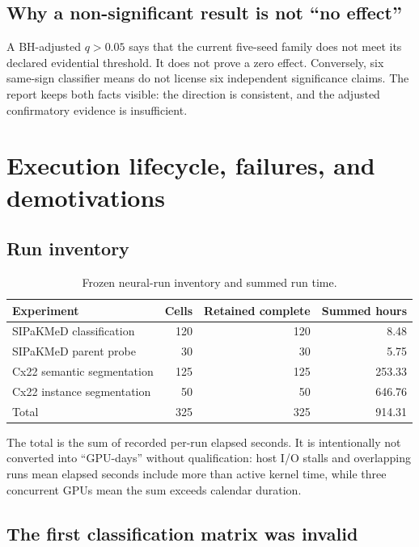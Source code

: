 \documentclass[11pt,oneside]{report}
\begin{document}
\section{Why a non-significant result is not ``no effect''}

A BH-adjusted $q>0.05$ says that the current five-seed family does not meet its declared evidential threshold. It does not prove a zero effect. Conversely, six same-sign classifier means do not license six independent significance claims. The report keeps both facts visible: the direction is consistent, and the adjusted confirmatory evidence is insufficient.

\chapter{Execution lifecycle, failures, and demotivations}

\section{Run inventory}

\begin{table}[H]
\centering
\caption{Frozen neural-run inventory and summed run time.}
\label{tab:inventory}
\begin{tabular}{lrrr}
\toprule
Experiment & Cells & Retained complete & Summed hours \\
\midrule
SIPaKMeD classification & 120 & 120 & 8.48 \\
SIPaKMeD parent probe & 30 & 30 & 5.75 \\
Cx22 semantic segmentation & 125 & 125 & 253.33 \\
Cx22 instance segmentation & 50 & 50 & 646.76 \\
\midrule
Total & 325 & 325 & 914.31 \\
\bottomrule
\end{tabular}
\end{table}

The total is the sum of recorded per-run elapsed seconds. It is intentionally not converted into ``GPU-days'' without qualification: host I/O stalls and overlapping runs mean elapsed seconds include more than active kernel time, while three concurrent GPUs mean the sum exceeds calendar duration.

\section{The first classification matrix was invalid}
\end{document}
